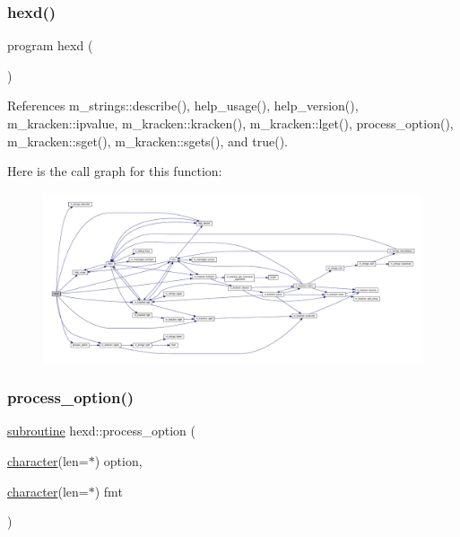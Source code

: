 \subsubsection{\texorpdfstring{hexd()}{hexd()}}
{\footnotesize\ttfamily program hexd (\begin{DoxyParamCaption}{ }\end{DoxyParamCaption})}



References m\+\_\+strings\+::describe(), help\+\_\+usage(), help\+\_\+version(), m\+\_\+kracken\+::ipvalue, m\+\_\+kracken\+::kracken(), m\+\_\+kracken\+::lget(), process\+\_\+option(), m\+\_\+kracken\+::sget(), m\+\_\+kracken\+::sgets(), and true().

Here is the call graph for this function\+:
\nopagebreak
\begin{figure}[H]
\begin{center}
\leavevmode
\includegraphics[width=350pt]{alphabet_8f90_aa1b7d174dbbe1ca1d92bf00b80724012_cgraph}
\end{center}
\end{figure}
\mbox{\label{alphabet_8f90_a697200725bfc294a3efd62fcb58b7255}} 
\subsubsection{\texorpdfstring{process\+\_\+option()}{process\_option()}}
{\footnotesize\ttfamily \hyperlink{M__stopwatch_83_8txt_acfbcff50169d691ff02d4a123ed70482}{subroutine} hexd\+::process\+\_\+option (\begin{DoxyParamCaption}\item[{\hyperlink{option__stopwatch_83_8txt_abd4b21fbbd175834027b5224bfe97e66}{character}(len=$\ast$)}]{option,  }\item[{\hyperlink{option__stopwatch_83_8txt_abd4b21fbbd175834027b5224bfe97e66}{character}(len=$\ast$)}]{fmt }\end{DoxyParamCaption})}




